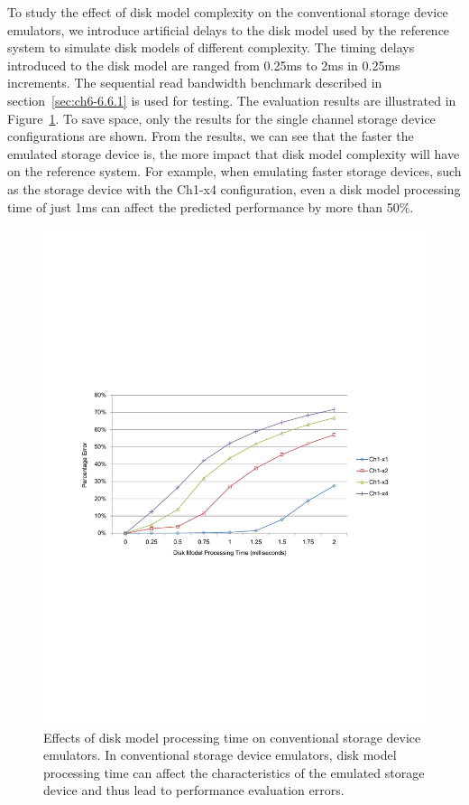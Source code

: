 To study the effect of disk model complexity on the conventional storage device emulators, we introduce artificial delays to the disk model used by the reference system to simulate disk models of different complexity. The timing delays introduced to the disk model are ranged from 0.25\si{\milli\second} to 2\si{\milli\second} in 0.25\si{\milli\second} increments. The sequential read bandwidth benchmark described in section~\ref{sec:ch6-6.6.1} is used for testing. The evaluation results are illustrated in Figure~\ref{fig:ch6-fig-13}. To save space, only the results for the single channel storage device configurations are shown. From the results, we can see that the faster the emulated storage device is, the more impact that disk model complexity will have on the reference system. For example, when emulating faster storage devices, such as the storage device with the Ch1-x4 configuration, even a disk model processing time of just 1\si{\milli\second} can affect the predicted performance by more than 50\%.

\begin{figure}[htpb]
	\centering
	\includegraphics[trim=2cm 9.2cm 2cm 9cm, width=\textwidth]{figures/ch6-fig-13.pdf}
	\caption[Effects of disk model processing time on conventional storage device emulators.]{\label{fig:ch6-fig-13}Effects of disk model processing time on conventional storage device emulators. In conventional storage device emulators, disk model processing time can affect the characteristics of the emulated storage device and thus lead to performance evaluation errors.}
\end{figure}

